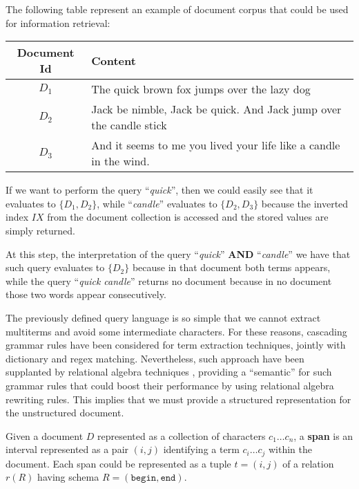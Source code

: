 \begin{example}
The following table represent an example of document corpus that could be used for information retrieval:

\begin{tabular}{c|l}
\toprule
	Document Id & Content \\
\midrule
	$D_1$ & The quick brown fox jumps over the lazy dog \\
	$D_2$ & Jack be nimble, Jack be quick. And Jack jump over the candle stick \\
	$D_3$ & And it seems to me you lived your life like a candle in the wind.\\
\bottomrule
\end{tabular}
	
If we want to perform the query ``\textit{quick}'', then we could easily see that it evaluates to $\{D_1,D_2\}$, while ``\textit{candle}'' evaluates to $\{D_2,D_3\}$ because the inverted index $IX$ from the document collection is accessed and the stored values are simply returned. 

At this step, the interpretation of the query ``\textit{quick}''\textbf{ AND }``\textit{candle}'' we have that such query evaluates to $\{D_2\}$ because in that document both terms appears, while the query ``\textit{quick candle}'' returns no document because in no document those two words appear consecutively.
\end{example}


The previously defined query language is so simple that we cannot extract multiterms and avoid some intermediate characters. For these reasons, cascading grammar rules have been considered for term extraction techniques, jointly with dictionary and regex matching. Nevertheless, such approach have been supplanted by relational algebra techniques \cite{IBMReiss}, providing a ``semantic'' for such grammar rules that could boost their performance by using relational algebra rewriting rules. This implies that we must provide a structured representation for the unstructured document. 

\begin{definition}[Span]
Given a document $D$ represented as a collection of characters $c_1\dots c_n$, a \textbf{span} \cite{IBMReiss} is an interval represented as a pair $(i,j)$ identifying a term $c_i\dots c_j$ within the document. Each span could be represented as a tuple $t=(i,j)$ of a relation $r(R)$ having schema $R=(\texttt{begin},\texttt{end})$.
\end{definition}

